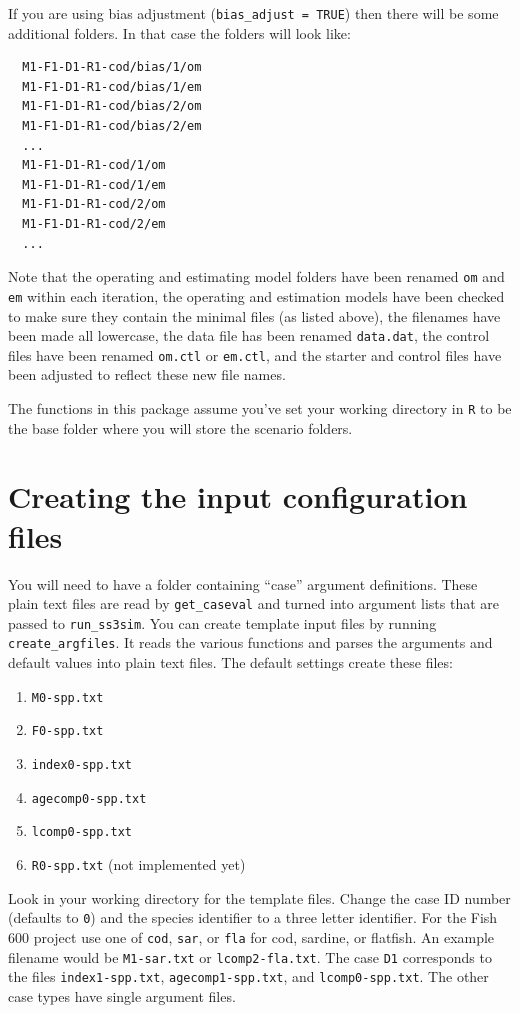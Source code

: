 \documentclass[12pt]{article}
\begin{document}
\noindent
If you are using bias adjustment (\texttt{bias\_adjust = TRUE}) then there 
will be some additional folders. In that case the folders will look like:

\begin{verbatim}
  M1-F1-D1-R1-cod/bias/1/om
  M1-F1-D1-R1-cod/bias/1/em
  M1-F1-D1-R1-cod/bias/2/om
  M1-F1-D1-R1-cod/bias/2/em
  ...
  M1-F1-D1-R1-cod/1/om
  M1-F1-D1-R1-cod/1/em
  M1-F1-D1-R1-cod/2/om
  M1-F1-D1-R1-cod/2/em
  ...
\end{verbatim}

\noindent
Note that the operating and estimating model folders have been renamed
\texttt{om} and \texttt{em} within each iteration, the operating and estimation 
models have been checked to make sure they contain the minimal files (as listed 
above), the filenames have been made all lowercase, the data file has been 
renamed \texttt{data.dat}, the control files have been renamed \texttt{om.ctl} 
or \texttt{em.ctl}, and the starter and control files have been adjusted to 
reflect these new file names.

The functions in this package assume you've set your working directory in 
\texttt{R} to be the base folder where you will store the scenario folders.

\section{Creating the input configuration files}
You will need to have a folder containing ``case'' argument definitions. These 
plain text files are read by \texttt{get\_caseval} and turned into argument 
lists that are passed to \texttt{run\_ss3sim}. You can create template input 
files by running \texttt{create\_argfiles}. It reads the various functions and 
parses the arguments and default values into plain text files. The default 
settings create these files:

\begin{enumerate}
  \item \texttt{M0-spp.txt}
  \item \texttt{F0-spp.txt}
  \item \texttt{index0-spp.txt}
  \item \texttt{agecomp0-spp.txt}
  \item \texttt{lcomp0-spp.txt}
  \item \texttt{R0-spp.txt} (not implemented yet)
\end{enumerate}

Look in your working directory for the template files. Change the case ID 
number (defaults to \texttt{0}) and the species identifier to a three letter 
identifier. For the Fish 600 project use one of \texttt{cod}, \texttt{sar}, or 
\texttt{fla} for cod, sardine, or flatfish. An example filename would be 
\texttt{M1-sar.txt} or \texttt{lcomp2-fla.txt}. The case \texttt{D1} 
corresponds to the files \texttt{index1-spp.txt}, \texttt{agecomp1-spp.txt}, 
and \texttt{lcomp0-spp.txt}. The other case types have single argument files.
\end{document}
